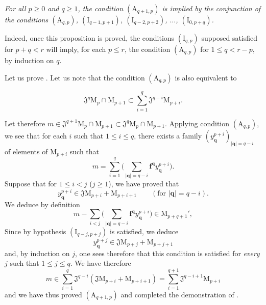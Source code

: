 \begin{env}[19.5.5.4]
\label{IV.19.5.5.4}
\emph{For all $p\geqslant 0$ and $q\geqslant 1$, the condition $(\mathrm{A}_{q+1,p})$ is implied by the conjunction of the conditions $(\mathrm{A}_{q,p})$, $(\mathrm{I}_{q-1,p+1})$, $(\mathrm{I}_{q-2,p+2})$, $\ldots$, $(\mathrm{I}_{0,p+q})$.}

Indeed, once this proposition is proved, the conditions $(\mathrm{I}_{q,p})$ supposed satisfied for $p+q<r$ will imply, for each $p\leqslant r$, the condition $(\mathrm{A}_{q,p})$ for $1\leqslant q<r-p$, by induction on $q$.

Let us prove . Let us note that the condition $(\mathrm{A}_{q,p})$ is also equivalent to
\end{env}

\begin{env}[19.5.5.5]
\label{IV.19.5.5.5}
\[
  \mathfrak{J}^q\mathrm{M}_p\cap\mathrm{M}_{p+1}\subset\textstyle\sum_{i=1}^{q}\mathfrak{J}^{q-i}\mathrm{M}_{p+i}.
\]

Let therefore $m\in\mathfrak{J}^{q+1}\mathrm{M}_p\cap\mathrm{M}_{p+1}\subset\mathfrak{J}^q\mathrm{M}_p\cap\mathrm{M}_{p+1}$. Applying condition $(\mathrm{A}_{q,p})$, we see that for each $i$ such that $1\leqslant i\leqslant q$, there exists a family $(y_\mathbf{q}^{p+i})_{|\mathbf{q}|=q-i}$ of elements of $\mathrm{M}_{p+i}$ such that
\[
  m=\textstyle\sum_{i=1}^{q}\bigl(\textstyle\sum_{|\mathbf{q}|=q-i}\mathbf{f}^\mathbf{q} y_\mathbf{q}^{p+i}\bigr).
\]
Suppose that for $1\leqslant i<j$ ($j\geqslant 1$), we have proved that
\[
  y_\mathbf{q}^{p+i}\in\mathfrak{J}\mathrm{M}_{p+i}+\mathrm{M}_{p+i+1}\qquad(\text{for }|\mathbf{q}|=q-i).
\]
We deduce by definition 
\[
  m-\textstyle\sum_{i<j}\bigl(\textstyle\sum_{|\mathbf{q}|=q-i}\mathbf{f}^\mathbf{q} y_\mathbf{q}^{p+i}\bigr)\in\mathrm{M}_{p+q+1}',
\]
Since by hypothesis $(\mathrm{I}_{q-j,p+j})$ is satisfied, we deduce
\[
  y_\mathbf{q}^{p+j}\in\mathfrak{J}\mathrm{M}_{p+j}+\mathrm{M}_{p+j+1}
\]
and, by induction on $j$, one sees therefore that this condition is satisfied for \emph{every} $j$ such that $1\leqslant j\leqslant q$. We have therefore
\[
  m\in\textstyle\sum_{i=1}^{q}\mathfrak{J}^{q-i}(\mathfrak{J}\mathrm{M}_{p+i}+\mathrm{M}_{p+i+1})=\textstyle\sum_{i=1}^{q+1}\mathfrak{J}^{q-i+1}\mathrm{M}_{p+i}
\]
and we have thus proved $(\mathrm{A}_{q+1,p})$ and completed the demonstration of .
\end{env}

